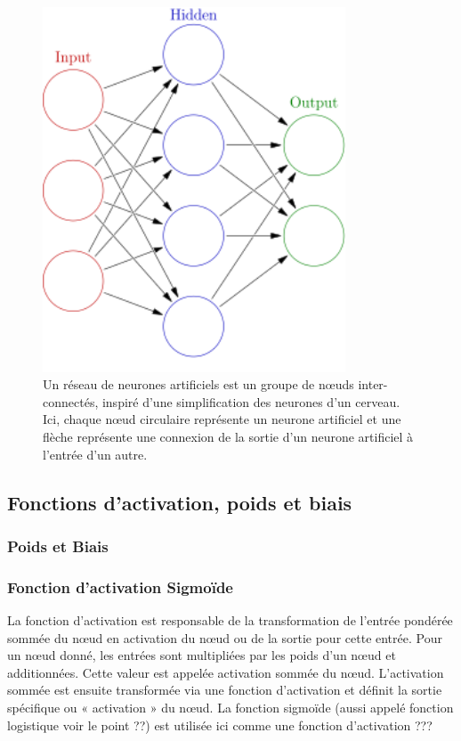 	
	
	\begin{figure}[hth]%
		\centering
		\includegraphics[width=9cm]{images/colored_neural_network.png}
		\caption{Un réseau de neurones artificiels est un groupe de nœuds inter-connectés, inspiré d'une simplification des neurones d'un cerveau. Ici, chaque nœud circulaire représente un neurone artificiel et une flèche représente une connexion de la sortie d'un neurone artificiel à l'entrée d'un autre.}
		\label{fig:colored_neural_network}
	\end{figure}
	
	\subsection{Fonctions d'activation, poids et biais} \label{sec:activation_weight}
	\subsubsection{Poids et Biais}
	\subsubsection{Fonction d'activation Sigmoïde}
	La fonction d'activation est responsable de la transformation de l'entrée pondérée sommée du nœud en activation du nœud ou de la sortie pour cette entrée.
	Pour un nœud donné, les entrées sont multipliées par les poids d'un nœud et additionnées. Cette valeur est appelée activation sommée du nœud. L'activation sommée est ensuite transformée via une fonction d'activation et définit la sortie spécifique ou « activation » du nœud.
	La fonction sigmoïde (aussi appelé fonction logistique voir le point ??) est utilisée ici comme une fonction d'activation ???
	
